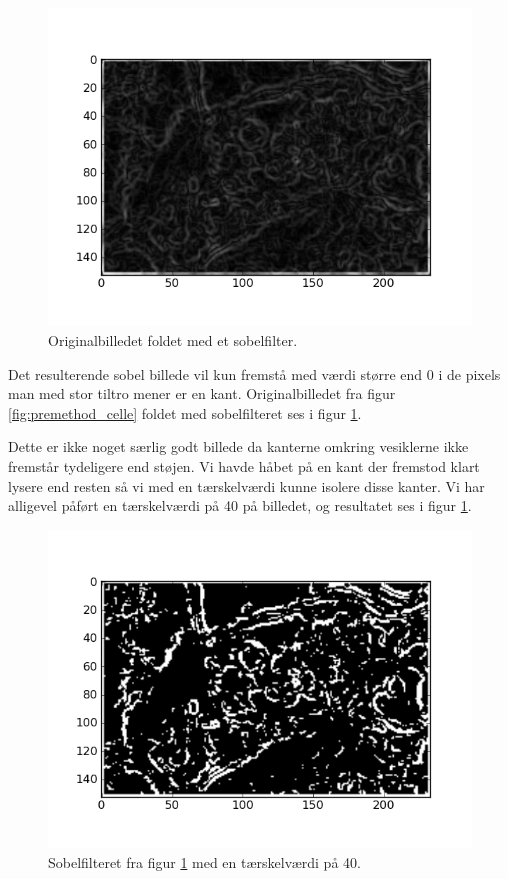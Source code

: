 \begin{figure}[H]
	\centering
	\includegraphics[scale=0.8]{files/premethod/img/sobel.png}
	\caption{Originalbilledet foldet med et sobelfilter.\label{fig:premethod_sobel}}
\end{figure}

Det resulterende sobel billede vil kun fremstå med værdi større end 0 i de pixels man med stor tiltro mener er en kant. Originalbilledet fra figur \ref{fig:premethod_celle} foldet med sobelfilteret ses i figur \ref{fig:premethod_sobel}. 

Dette er ikke noget særlig godt billede da kanterne omkring vesiklerne ikke fremstår tydeligere end støjen. Vi havde håbet på en kant der fremstod klart lysere end resten så vi med en tærskelværdi kunne isolere disse kanter. Vi har alligevel påført en tærskelværdi på 40 på billedet, og resultatet ses i figur \ref{fig:premethod_sobel}.

\begin{figure}[H]
	\centering
	\includegraphics[scale=0.8]{files/premethod/img/edgemap.png}
	\caption{Sobelfilteret fra figur \ref{fig:premethod_sobel} med en tærskelværdi på 40.\label{fig:premethod_edgemap}}
\end{figure}

